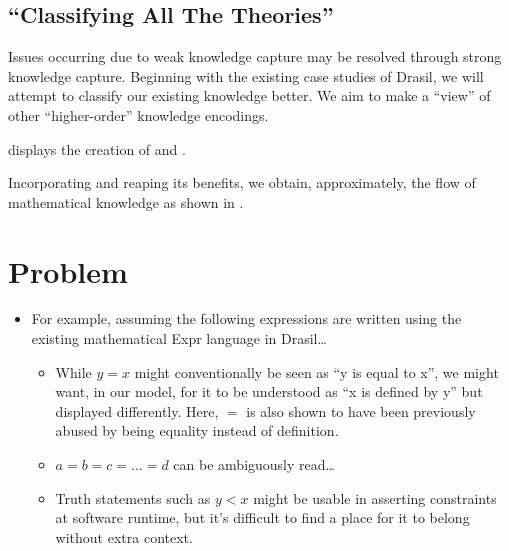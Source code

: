 \subsection{``Classifying All The Theories''}

Issues occurring due to weak knowledge capture may be resolved through strong
knowledge capture. Beginning with the existing case studies of Drasil, we will
attempt to classify our existing knowledge better. We aim to make
\RelationConcept{} a ``view'' of other ``higher-order'' knowledge encodings.

\currentModelKindsHaskell{}

 displays the creation of \ModelKind{} and
\ModelKinds{}.



Incorporating \ModelKinds{} and reaping its benefits, we obtain, approximately,
the flow of mathematical knowledge as shown in .

\theoriesWithModelKinds{}


\section{Problem}

\begin{itemize}

	\item For example, assuming the following expressions are written using the
	      existing mathematical Expr language in Drasil\ldots{}
	      \begin{itemize}

		      \item While \(y = x\) might conventionally be seen as ``y is equal
		            to x'', we might want, in our model, for it to be understood
		            as ``x is defined by y'' but displayed differently. Here,
		            \(=\) is also shown to have been previously abused by being
		            equality instead of definition.

		      \item \(a = b = c = ... = d\) can be ambiguously read\ldots{}

		      \item Truth statements such as \(y < x\) might be usable in
		            asserting constraints at software runtime, but it's
		            difficult to find a place for it to belong without extra
		            context.

	      \end{itemize}

\end{itemize}

